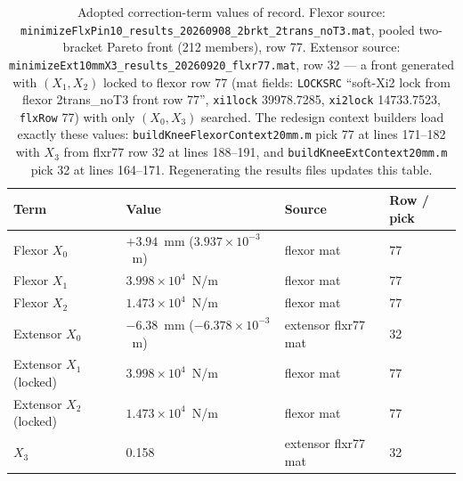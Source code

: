 \begin{table}[htbp]
\caption{Adopted correction-term values of record. Flexor source: \texttt{minimizeFlxPin10\_results\_20260908\_2brkt\_2trans\_noT3.mat}, pooled two-bracket Pareto front (212 members), row 77. Extensor source: \texttt{minimizeExt10mmX3\_results\_20260920\_flxr77.mat}, row 32 --- a front generated with $(X_{1}, X_{2})$ locked to flexor row 77 (mat fields: \texttt{LOCKSRC} ``soft-Xi2 lock from flexor 2trans\_noT3 front row 77'', \texttt{xi1lock} 39978.7285, \texttt{xi2lock} 14733.7523, \texttt{flxRow} 77) with only $(X_{0}, X_{3})$ searched. The redesign context builders load exactly these values: \texttt{buildKneeFlexorContext20mm.m} pick 77 at lines 171--182 with $X_{3}$ from flxr77 row 32 at lines 188--191, and \texttt{buildKneeExtContext20mm.m} pick 32 at lines 164--171. Regenerating the results files updates this table.}
\label{tab:app_xi_values}
\begin{tabular}{@{}llll@{}}
\toprule
\textbf{Term} & \textbf{Value} & \textbf{Source} & \textbf{Row / pick} \\
\midrule
Flexor $X_{0}$   & $+3.94$~mm ($3.937\times10^{-3}$~m) & flexor mat & 77 \\
Flexor $X_{1}$   & $3.998\times10^{4}$~N/m           & flexor mat & 77 \\
Flexor $X_{2}$   & $1.473\times10^{4}$~N/m           & flexor mat & 77 \\
Extensor $X_{0}$ & $-6.38$~mm ($-6.378\times10^{-3}$~m) & extensor flxr77 mat & 32 \\
Extensor $X_{1}$ (locked) & $3.998\times10^{4}$~N/m  & flexor mat & 77 \\
Extensor $X_{2}$ (locked) & $1.473\times10^{4}$~N/m  & flexor mat & 77 \\
$X_{3}$          & 0.158                            & extensor flxr77 mat & 32 \\
\bottomrule
\end{tabular}
\end{table}

